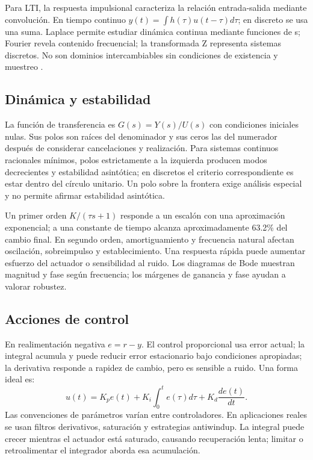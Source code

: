Para LTI, la respuesta impulsional caracteriza la relación entrada-salida mediante convolución. En tiempo continuo $y(t)=\int h(\tau)u(t-\tau)d\tau$; en discreto se usa una suma. Laplace permite estudiar dinámica continua mediante funciones de s; Fourier revela contenido frecuencial; la transformada Z representa sistemas discretos. No son dominios intercambiables sin condiciones de existencia y muestreo \cite{signals}.

\subsection{Dinámica y estabilidad}
La función de transferencia es $G(s)=Y(s)/U(s)$ con condiciones iniciales nulas. Sus polos son raíces del denominador y sus ceros las del numerador después de considerar cancelaciones y realización. Para sistemas continuos racionales mínimos, polos estrictamente a la izquierda producen modos decrecientes y estabilidad asintótica; en discretos el criterio correspondiente es estar dentro del círculo unitario. Un polo sobre la frontera exige análisis especial y no permite afirmar estabilidad asintótica.

Un primer orden $K/(\tau s+1)$ responde a un escalón con una aproximación exponencial; a una constante de tiempo alcanza aproximadamente 63.2\% del cambio final. En segundo orden, amortiguamiento y frecuencia natural afectan oscilación, sobreimpulso y establecimiento. Una respuesta rápida puede aumentar esfuerzo del actuador o sensibilidad al ruido. Los diagramas de Bode muestran magnitud y fase según frecuencia; los márgenes de ganancia y fase ayudan a valorar robustez.

\subsection{Acciones de control}
En realimentación negativa $e=r-y$. El control proporcional usa error actual; la integral acumula y puede reducir error estacionario bajo condiciones apropiadas; la derivativa responde a rapidez de cambio, pero es sensible a ruido. Una forma ideal es:
\begin{equation}
u(t)=K_p e(t)+K_i\int_0^t e(\tau)d\tau+K_d\frac{de(t)}{dt}.
\end{equation}
Las convenciones de parámetros varían entre controladores. En aplicaciones reales se usan filtros derivativos, saturación y estrategias antiwindup. La integral puede crecer mientras el actuador está saturado, causando recuperación lenta; limitar o retroalimentar el integrador aborda esa acumulación.

